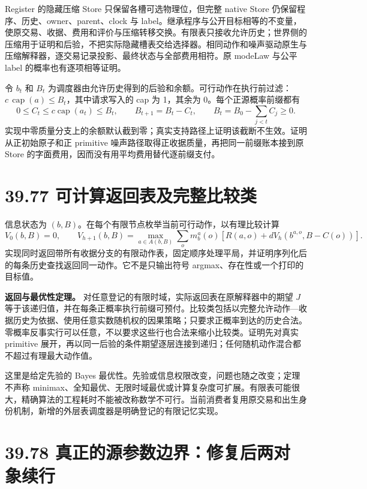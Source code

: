 \documentclass[
  11pt,
  oneside]{book}
\begin{document}
Register 的隐藏压缩 Store 只保留各槽可选物理位，但完整 native Store 仍保留程序、历史、owner、parent、clock 与 label。继承程序与公开目标相等的不变量，使原交易、收据、费用和评价与压缩转移交换。有限表只接收允许历史；世界侧的压缩用于证明和后验，不把实际隐藏槽表交给选择器。相同动作和噪声驱动原生与压缩解释器，逐交易记录投影、最终状态与全部费用相符。原 modeLaw 与公平 label 的概率也有逐项相等证明。

令 \(b_t\) 和 \(B_t\) 为调度器由允许历史得到的后验和余额。可行动作在执行前过滤：\(c\,\operatorname{cap}(a)\le B_t\)，其中请求写入的 cap 为 1，其余为 0。每个正源概率前缀都有 \[0\le C_t\le c\operatorname{cap}(a_t)\le B_t,
\qquad B_{t+1}=B_t-C_t,
\qquad B_t=B_0-\sum_{j<t}C_j\ge0.\] 实现中零质量分支上的余额默认截到零；真实支持路径上证明该截断不生效。证明从正初始原子和正 primitive 噪声路径取得正收据质量，再把同一前缀账本接到原 Store 的字面费用，因而没有用平均费用替代逐前缀支付。

\section{39.77 可计算返回表及完整比较类}\label{ux53efux8ba1ux7b97ux8fd4ux56deux8868ux53caux5b8cux6574ux6bd4ux8f83ux7c7b}

信息状态为 \((b,B)\)。在每个有限节点枚举当前可行动作，以有理比较计算 \[V_0(b,B)=0,\qquad
V_{h+1}(b,B)=\max_{a\in A(b,B)}
\sum_o m_b^a(o)\left[R(a,o)+dV_h(b^{a,o},B-C(o))\right].\] 实现同时返回带所有收据分支的有限动作表，固定顺序处理平局，并证明序列化后的每条历史查找返回同一动作。它不是只输出符号 argmax、存在性或一个打印的目标值。

\textbf{返回与最优性定理。} 对任意登记的有限时域，实际返回表在原解释器中的期望 \(J\) 等于该递归值，并在每条正概率执行前缀可预付。比较类包括以完整允许动作---收据历史为依据、使用任意实数随机权的因果策略；只要求正概率到达的历史合法。零概率反事实行可以任意，不以要求这些行也合法来缩小比较类。证明先对真实 primitive 展开，再以同一后验的条件期望逐层连接到递归；任何随机动作混合都不超过有理最大动作值。

这里是给定先验的 Bayes 最优性。先验或信息权限改变，问题也随之改变；定理不声称 minimax、全知最优、无限时域最优或计算复杂度可扩展。有限表可能很大，精确算法的工程耗时不能被改称数学不可行。当前消费者复用原交易和出生身份机制，新增的外层表调度器是明确登记的有限记忆实现。

\section{39.78 真正的源参数边界：修复后两对象续行}\label{ux771fux6b63ux7684ux6e90ux53c2ux6570ux8fb9ux754cux4feeux590dux540eux4e24ux5bf9ux8c61ux7eedux884c}
\end{document}
